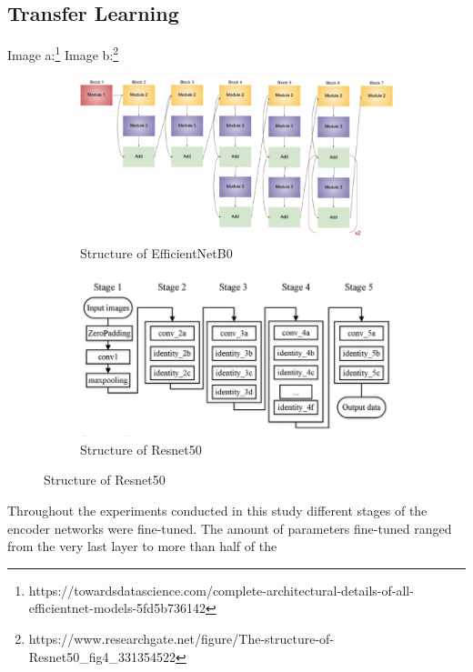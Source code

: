 \subsection{Transfer Learning}\label{methodTransferlearning}
Image a:\footnote{https://towardsdatascience.com/complete-architectural-details-of-all-efficientnet-models-5fd5b736142} Image b:\footnote{https://www.researchgate.net/figure/The-structure-of-Resnet50\_fig4\_331354522}
\begin{figure}[H]
    \centering
    \begin{subfigure}[b]{0.49\textwidth}
      \includegraphics[width=\textwidth]{pictures/random/EfficientNetB0}
      \caption{Structure of EfficientNetB0}
      \label{fig:1}
    \end{subfigure}
    \begin{subfigure}[b]{0.49\textwidth}
      \includegraphics[width=\textwidth]{pictures/random/ResNet50structure}
      \caption{Structure of Resnet50}
      \label{fig:2}
    \end{subfigure}
    \label{fig:ArchitectureOfCNN}
\end{figure}
Throughout the experiments conducted in this study different stages of the encoder networks were fine-tuned. The amount of parameters fine-tuned ranged from the very last layer to more than half of the
